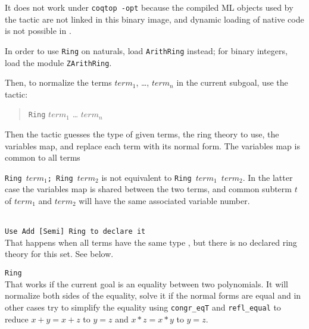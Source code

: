 It does not work under \texttt{coqtop -opt} because the compiled ML
objects used by the tactic are not linked in this binary image, and
dynamic loading of native code is not possible in \ocaml.

In order to use \texttt{Ring} on naturals, load \texttt{ArithRing}
instead; for binary integers, load the module \texttt{ZArithRing}.

Then, to normalize the terms $term_1$, \dots, $term_n$ in
the current subgoal, use the tactic:

\begin{quotation}
\texttt{Ring} $term_1$ \dots{} $term_n$
\end{quotation}

Then the tactic guesses the type of given terms, the ring theory to
use, the variables map, and replace each term with its normal form.
The variables map is common to all terms

\Warning \texttt{Ring $term_1$; Ring $term_2$} is not equivalent to 
\texttt{Ring $term_1$ $term_2$}. In the latter case the variables map
is shared between the two terms, and common subterm $t$ of $term_1$
and $term_2$ will have the same associated variable number.

\begin{ErrMsgs}
\item {}
\item {}
\item {}\\
  \texttt{Use Add [Semi] Ring to declare it}\\
  That happens when all terms have the same type \term, but there is
  no declared ring theory for this set. See below.
\end{ErrMsgs}

\begin{Variants}
\item \texttt{Ring}\\
  That works if the current goal is an equality between two
  polynomials. It will normalize both sides of the
  equality, solve it if the normal forms are equal and in other cases
  try to simplify the equality using \texttt{congr\_eqT} and \texttt{refl\_equal}
  to reduce $x + y = x + z$ to $y = z$ and $x * z = x * y$ to $y = z$.

  \ErrMsg{}

\end{Variants}

